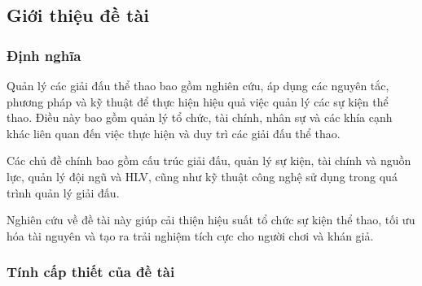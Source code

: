\subsection{Giới thiệu đề tài}
\setcounter{figure}{0}

\subsubsection{Định nghĩa}
Quản lý các giải đấu thể thao bao gồm nghiên cứu, áp dụng các nguyên tắc,
phương pháp và kỹ thuật để thực hiện hiệu quả việc quản lý các sự kiện thể thao.
Điều này bao gồm quản lý tổ chức, tài chính, nhân sự và các khía cạnh khác
liên quan đến việc thực hiện và duy trì các giải đấu thể thao.
\par
Các chủ đề chính bao gồm cấu trúc giải đấu, quản lý sự kiện, tài chính và nguồn lực,
quản lý đội ngũ và HLV, cũng như kỹ thuật công nghệ sử dụng trong quá trình quản lý
giải đấu.
\par
Nghiên cứu về đề tài này giúp cải thiện hiệu suất tổ chức sự kiện thể thao,
tối ưu hóa tài nguyên và tạo ra trải nghiệm tích cực cho người chơi và khán giả.


\subsubsection{Tính cấp thiết của đề tài }

